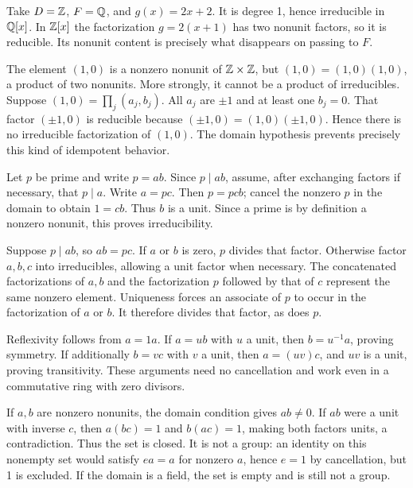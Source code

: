 Take $D=\mathbb{Z}$, $F=\mathbb{Q}$, and $g(x)=2x+2$. It is degree 1, hence irreducible in $\mathbb{Q}[x]$. In $\mathbb{Z}[x]$ the factorization $g=2(x+1)$ has two nonunit factors, so it is reducible. Its nonunit content is precisely what disappears on passing to $F$.

The element $(1,0)$ is a nonzero nonunit of $\mathbb{Z}\times\mathbb{Z}$, but $(1,0)=(1,0)(1,0)$, a product of two nonunits. More strongly, it cannot be a product of irreducibles. Suppose $(1,0)=\prod_j(a_j,b_j)$. All $a_j$ are $\pm1$ and at least one $b_j=0$. That factor $(\pm1,0)$ is reducible because $(\pm1,0)=(1,0)(\pm1,0)$. Hence there is no irreducible factorization of $(1,0)$. The domain hypothesis prevents precisely this kind of idempotent behavior.

Let $p$ be prime and write $p=ab$. Since $p\mid ab$, assume, after exchanging factors if necessary, that $p\mid a$. Write $a=pc$. Then $p=pcb$; cancel the nonzero $p$ in the domain to obtain $1=cb$. Thus $b$ is a unit. Since a prime is by definition a nonzero nonunit, this proves irreducibility.

Suppose $p\mid ab$, so $ab=pc$. If $a$ or $b$ is zero, $p$ divides that factor. Otherwise factor $a,b,c$ into irreducibles, allowing a unit factor when necessary. The concatenated factorizations of $a,b$ and the factorization $p$ followed by that of $c$ represent the same nonzero element. Uniqueness forces an associate of $p$ to occur in the factorization of $a$ or $b$. It therefore divides that factor, as does $p$.

Reflexivity follows from $a=1a$. If $a=ub$ with $u$ a unit, then $b=u^{-1}a$, proving symmetry. If additionally $b=vc$ with $v$ a unit, then $a=(uv)c$, and $uv$ is a unit, proving transitivity. These arguments need no cancellation and work even in a commutative ring with zero divisors.

If $a,b$ are nonzero nonunits, the domain condition gives $ab\ne0$. If $ab$ were a unit with inverse $c$, then $a(bc)=1$ and $b(ac)=1$, making both factors units, a contradiction. Thus the set is closed. It is not a group: an identity on this nonempty set would satisfy $ea=a$ for nonzero $a$, hence $e=1$ by cancellation, but 1 is excluded. If the domain is a field, the set is empty and is still not a group.

